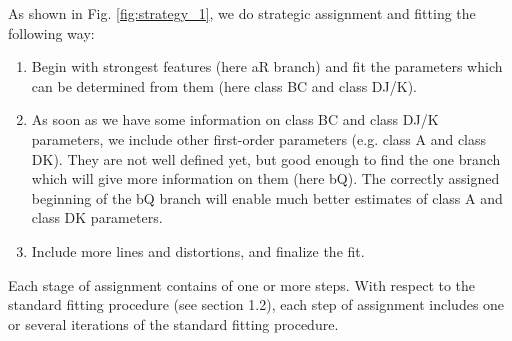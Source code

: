 \documentclass[11pt]{article}
\begin{document}
As shown in Fig. \ref{fig:strategy_1}, we do strategic assignment and fitting the following way:
\begin{enumerate}
    \item  Begin with strongest features (here aR branch) and fit the parameters which can be determined from them (here class BC and class DJ/K).
    \item As soon as we have some information on class BC and class DJ/K parameters, we include other first-order parameters (e.g. class A and class DK). They are not well defined yet, but good enough to find the one branch which will give more information on them (here bQ). The correctly assigned beginning of the bQ branch will enable much better estimates of class A and class DK parameters.
    \item Include more lines and distortions, and finalize the fit.
\end{enumerate} 

Each stage of assignment contains of one or more steps. With respect to the standard fitting procedure (see section 1.2), each step of assignment includes one or several iterations of the standard fitting procedure.
\end{document}
